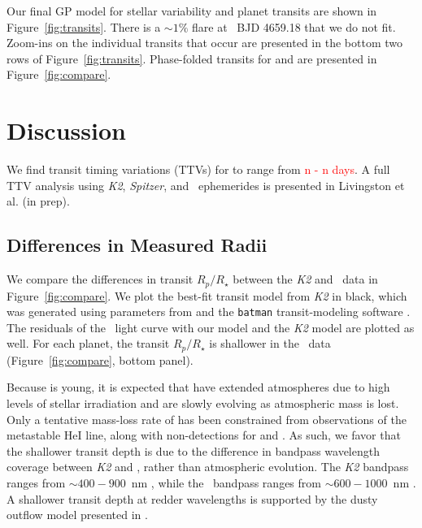 \documentclass[twocolumn]{aastex631}
\begin{document}
Our final GP model for stellar variability and planet transits are shown in Figure~\ref{fig:transits}. There is a $\sim 1\%$ flare at \tess\ BJD 4659.18 that we do not fit. Zoom-ins on the individual transits that occur are presented in the bottom two rows of Figure~\ref{fig:transits}. Phase-folded transits for \planetc and \planetd are presented in Figure~\ref{fig:compare}.

\section{Discussion} \label{sec:discussion}

We find transit timing variations (TTVs) for \planetknown to range from \textcolor{red}{n - n days}. A full TTV analysis using \textit{K2}, \textit{Spitzer}, and \tess\ ephemerides is presented in Livingston et al. (in prep). 


\subsection{Differences in Measured Radii}

We compare the differences in transit $R_p/R_\star$ between the \textit{K2} and \tess\ data in Figure~\ref{fig:compare}. We plot the best-fit transit model from \textit{K2} in black, which was generated using parameters from \cite{David2019a} and the \texttt{batman} transit-modeling software \citep{Kreidberg15}. The residuals of the \tess\ light curve with our model and the \textit{K2} model are plotted as well. For each planet, the transit $R_p/R_\star$ is shallower in the \tess\ data (Figure~\ref{fig:compare}, bottom panel).

Because \sname is young, it is expected that \allplanets have extended atmospheres due to high levels of stellar irradiation \citep{OwenWu2017} and are slowly evolving as atmospheric mass is lost. Only a tentative mass-loss rate of \planetd has been constrained from observations of the metastable He\textsc{I} line, along with non-detections for \planetb and \planetc \citep{Vissapragada21}. As such, we favor that the shallower transit depth is due to the difference in bandpass wavelength coverage between \textit{K2} and \tess, rather than atmospheric evolution. The \textit{K2} bandpass ranges from $\sim 400-900$~nm \citep{Howell2014}, while the \tess\ bandpass ranges from $\sim 600-1000$~nm \citep{Ricker2015}. A shallower transit depth at redder wavelengths is supported by the dusty outflow model presented in \citep{wang19}.
\end{document}
